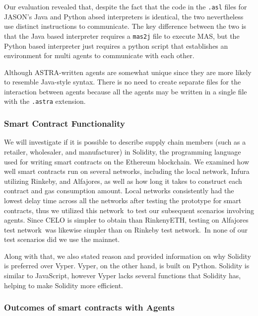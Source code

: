   \vspace{.5cm}
  
  Our evaluation revealed that, despite the fact that the code in the \texttt{.asl} files for JASON's Java and Python absed interpreters is identical, the two nevertheless use distinct instructions to communicate. The key difference between the two is that the Java based interpreter requires a \texttt{mas2j} file to execute \ac{MAS}, but the Python based interpreter just requires a python script that establishes an environment for multi agents to communicate with each other.

  \vspace{.5cm}

  Although ASTRA-written agents are somewhat unique since they are more likely to resemble Java-style syntax. There is no need to create separate files for the interaction between agents because all the agents may be written in a single file with the \texttt{.astra} extension.
  
\subsubsection{Smart Contract Functionality}
  
  We will investigate if it is possible to describe supply chain members (such as a retailer, wholesaler, and manufacturer) in Solidity, the programming language used for writing smart contracts on the Ethereum blockchain. We examined how well smart contracts run on several networks, including the local network, Infura utilizing Rinkeby, and Alfajores, as well as how long it takes to construct each contract and gas consumption amount. Local networks consistently had the lowest delay time across all the networks after testing the prototype for smart contracts, thus we utilized this network to test our subsequent scenarios involving agents. Since CELO is simpler to obtain than RinkenyETH, testing on Alfajores test network was likewise simpler than on Rinkeby test network. In none of our test scenarios did we use the mainnet.
  
  \vspace{.5cm}
  
  Along with that, we also stated reason and provided information on why Solidity is preferred over Vyper. Vyper, on the other hand, is built on Python. Solidity is similar to JavaScript, however Vyper lacks several functions that Solidity has, helping to make Solidity more efficient.

\subsubsection{Outcomes of smart contracts with Agents}

